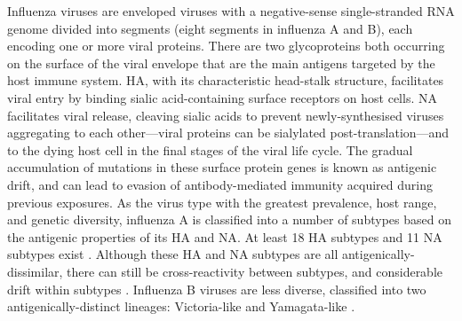 Influenza viruses are enveloped viruses with a negative-sense single-stranded RNA genome divided into segments (eight segments in influenza A and B), each encoding one or more viral proteins.
There are two glycoproteins both occurring on the surface of the viral envelope that are the main antigens targeted by the host immune system.
\Gls{HA}, with its characteristic head-stalk structure, facilitates viral entry by binding sialic acid-containing surface receptors on host cells.
\Gls{NA} facilitates viral release, cleaving sialic acids to prevent newly-synthesised viruses aggregating to each other---viral proteins can be sialylated post-translation---and to the dying host cell in the final stages of the viral life cycle.
The gradual accumulation of mutations in these surface protein genes is known as antigenic drift,
and can lead to evasion of antibody-mediated immunity acquired during previous exposures.
As the virus type with the greatest prevalence, host range, and genetic diversity,
influenza A is classified into a number of subtypes based on the antigenic properties of its \gls{HA} and \gls{NA}.
At least 18 \gls{HA} subtypes and 11 \gls{NA} subtypes exist \autocite{krammer2019HumanAntibodyResponse}.
Although these \gls{HA} and \gls{NA} subtypes are all antigenically-dissimilar, 
there can still be cross-reactivity between subtypes, and considerable drift within subtypes \autocite{worldhealthorganization1980RevisionSystemNomenclature}.
%
%
Influenza B viruses are less diverse, classified into two antigenically-distinct lineages: Victoria-like and Yamagata-like \autocite{krammer2018Influenza}.

